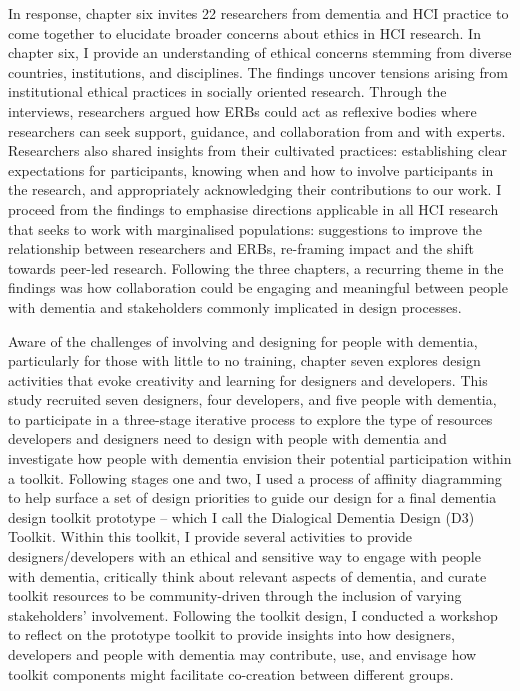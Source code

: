 In response, chapter six invites 22 researchers from dementia and HCI practice to come together to elucidate broader concerns about ethics in HCI research. In chapter six, I provide an understanding of ethical concerns stemming from diverse countries, institutions, and disciplines. The findings uncover tensions arising from institutional ethical practices in socially oriented research. Through the interviews, researchers argued how ERBs could act as reflexive bodies where researchers can seek support, guidance, and collaboration from and with experts. Researchers also shared insights from their cultivated practices: establishing clear expectations for participants, knowing when and how to involve participants in the research, and appropriately acknowledging their contributions to our work. I proceed from the findings to emphasise directions applicable in all HCI research that seeks to work with marginalised populations: suggestions to improve the relationship between researchers and ERBs, re-framing impact and the shift towards peer-led research. Following the three chapters, a recurring theme in the findings was how collaboration could be engaging and meaningful between people with dementia and stakeholders commonly implicated in design processes.

Aware of the challenges of involving and designing for people with dementia, particularly for those with little to no training, chapter seven explores design activities that evoke creativity and learning for designers and developers. This study recruited seven designers, four developers, and five people with dementia, to participate in a three-stage iterative process to explore the type of resources developers and designers need to design with people with dementia and investigate how people with dementia envision their potential participation within a toolkit. Following stages one and two, I used a process of affinity diagramming to help surface a set of design priorities to guide our design for a final dementia design toolkit prototype – which I call the Dialogical Dementia Design (D3) Toolkit. Within this toolkit, I provide several activities to provide designers/developers with an ethical and sensitive way to engage with people with dementia, critically think about relevant aspects of dementia, and curate toolkit resources to be community-driven through the inclusion of varying stakeholders’ involvement. Following the toolkit design, I conducted a workshop to reflect on the prototype toolkit to provide insights into how designers, developers and people with dementia may contribute, use, and envisage how toolkit components might facilitate co-creation between different groups.

